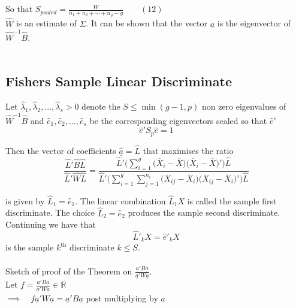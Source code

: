 \documentclass[11pt,a4paper]{article}
\theoremstyle{definition}
\begin{document}
So that $\displaystyle{S_{pooled}=\frac{\widehat{W}}{n_1+n_2+\cdots+n_g-g}}\qquad (12)$\\

$\widehat{W}$ is an estimate of $\displaystyle{\Sigma}$. It can be shown that the vector $\underline{a}$ is the eigenvector of $\widehat{W}^{-1}\widehat{B}$.\\\\




\subsection{Fishers Sample Linear Discriminate}
Let $\hat{\lambda}_1,\hat{\lambda}_2,\ldots, \hat{\lambda}_s>0$ denote the $S\leq \min(g-1,p)$ non zero eigenvalues of $\widehat{W}^{-1}\widehat{B}$ and $\hat{e}_1,\hat{e}_2,\ldots, \hat{e}_s$ be the corresponding eigenvectors scaled so that $\hat{e}'$ $$\hat{e}'S_p\hat{e}=1$$

Then the vector of coefficients $\widehat{\underline{a}}= \widehat{L}$ that maximises the ratio \begin{equation}\tag{13}
\frac{\widehat{L}'\widehat{B}\widehat{L}}{\widehat{L}'\widehat{W}\widehat{L}}=\frac{\widehat{L}'\Bigg(\sum\limits^g_{i=1}\big(\overline{X}_i-\overline{X}\big)\big(\overline{X}_i-\overline{X}\big)'\Bigg)\widehat{L}}{\widehat{L}'\Bigg(\sum\limits^g_{i=1}\sum\limits^{n_i}_{j=1}\big(X_{ij}-\overline{X}_i\big)\big(X_{ij}-\overline{X}_i\big)'\Bigg)\widehat{L}}
\end{equation}

is given by $\widehat{L}_1=\widehat{e}_1$. The linear combination $\widehat{L}_1X$ is called the sample first discriminate. The choice $\widehat{L}_2 =\widehat{e}_2$ produces the sample second discriminate. Continuing we have that $$\widehat{L}'_kX =\widehat{e}'_kX$$ is the sample $k^{\text{th}}$ discriminate $k\leq S$.\\\\


Sketch of proof of the Theorem on $\displaystyle{\frac{\underline{a}'B\underline{a}}{\underline{a}'W\underline{a}}}$.\\

Let $\displaystyle{f=\frac{\underline{a}'B\underline{a}}{\underline{a}'W\underline{a}}\in \mathbb{R}}$\\

$\implies \quad  f\underline{a}'W\underline{a} = \underline{a}'B\underline{a}$ post multiplying by $\underline{a}$\\
\end{document}
